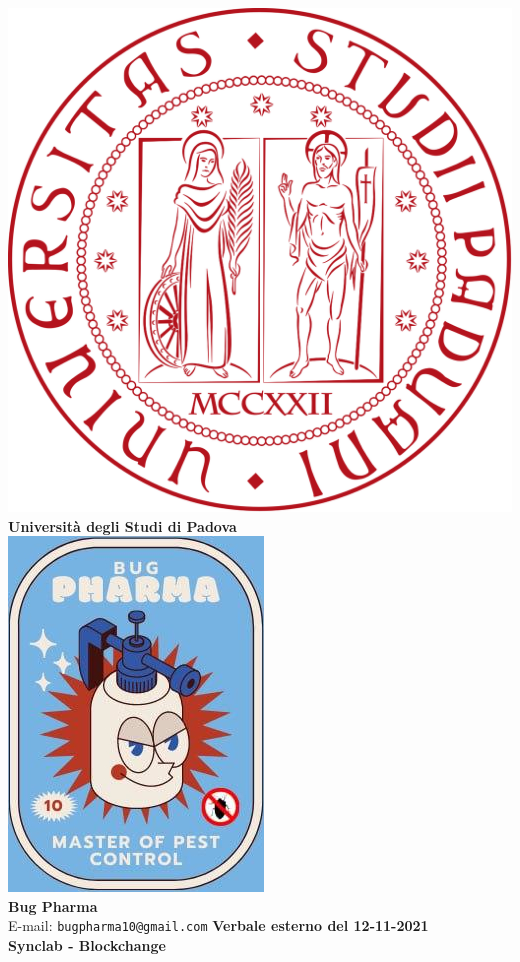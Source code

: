 \documentclass[11pt]{article}
\begin{document}
	\thispagestyle{empty}
	\begin{titlepage}
		\begin{center}
			\includegraphics[scale = 0.05]{../../logo_unipd.png}\\
			\large \textbf{Università degli Studi di Padova} \\
			\vfill
			\includegraphics[scale = 0.7]{../../logo_small.jpg}\\
			\large \textbf{Bug Pharma} \\
			\vfill
			\large
			E-mail: 
			\texttt{bugpharma10@gmail.com}
			\vfill
			\Huge \textbf{Verbale esterno del 12-11-2021}\\
			\large \textbf{Synclab - Blockchange}\\
			

\end{center}
\end{titlepage}
\end{document}
